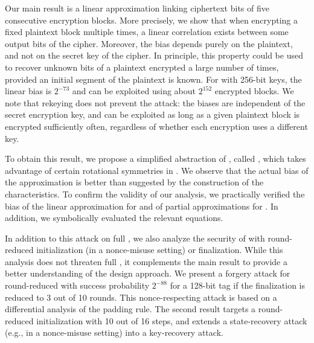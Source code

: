 Our main result is a linear approximation \cite{eurocryptMatsui93,eurocryptMatsuiY92} linking ciphertext bits of five consecutive encryption blocks.
More precisely, we show that when encrypting a fixed plaintext block multiple times, a linear correlation exists between some output bits of the cipher.
Moreover, the bias depends purely on the plaintext, and not on the secret key of the cipher.
In principle, this property could be used to recover unknown bits of a plaintext encrypted a large number of times, provided an initial segment of the plaintext is known.
For \morus[1280] with 256-bit keys, the linear bias is $2^{-73}$
and can be exploited using about $2^{152}$ encrypted blocks.
We note that rekeying does not prevent the attack: the biases are independent of the secret encryption key, and can be exploited as long as a given plaintext block is encrypted sufficiently often, regardless of whether each encryption uses a different key.

To obtain this result, we propose a simplified abstraction of \morus, called \minimorus, which takes advantage of certain rotational symmetries in \morus.
We observe that the actual bias of the approximation is better than suggested by the construction of the characteristics.
To confirm the validity of our analysis,
we practically verified the bias of the linear approximation for \minimorus and of partial approximations for \morus.
In addition, we symbolically evaluated the relevant equations.

In addition to this attack on full \morus, we also analyze the security of \morus with round-reduced initialization (in a nonce-misuse setting) or finalization.
While this analysis does not threaten full \morus, it complements the main result to provide a better understanding of the \morus design approach.
We present a forgery attack for round-reduced \morus[1280] with success probability $2^{-88}$ for a 128-bit tag if the finalization is reduced to 3 out of 10 rounds. This nonce-respecting attack is based on a differential analysis of the padding rule.
The second result targets a round-reduced initialization with 10 out of 16 steps, and extends a state-recovery attack (e.g., in a nonce-misuse setting) into a key-recovery attack.


